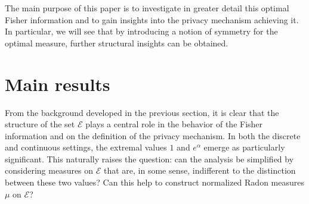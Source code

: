 \documentclass[a4paper, 11pt]{article}
\theoremstyle{definition}
\newcommand{\modar}{\color{black}}
\begin{document}
{The main purpose of this paper is to investigate in greater detail this optimal Fisher information and to gain insights into the privacy mechanism achieving it. In particular, we will see that by introducing a notion of symmetry for the optimal measure, further structural insights can be obtained. %


\section{Main results}{\label{s: main}}


From the background developed in the previous section, it is clear that the structure of the set $\mathcal{E}$ plays a central role in the behavior of the Fisher information {\modar and on the definition of the privacy mechanism.}
	In both the discrete and continuous settings, the extremal values $1$ and $e^\alpha$ emerge as particularly significant. This naturally raises the question: can the analysis be simplified by considering measures on $\mathcal{E}$ that are, in some sense, indifferent to the distinction between these two values? Can this help to construct normalized Radon measures $\mu$ on $\mathcal{E}$?

}
\end{document}
